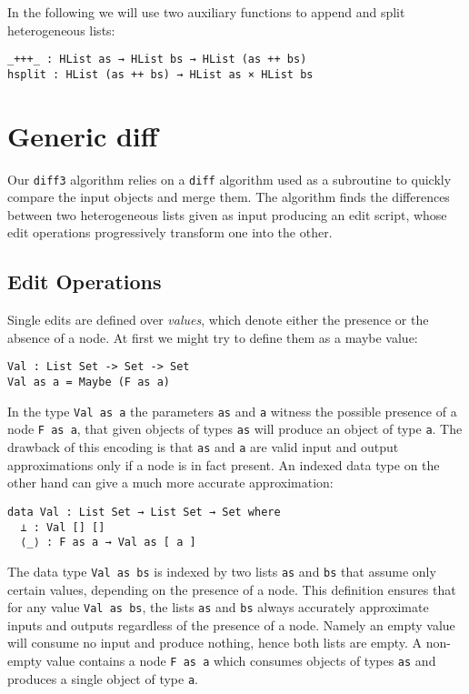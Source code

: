 \documentclass[preprint]{sigplanconf}
\theoremstyle{plain}
\begin{document}
	In the following we will use two auxiliary functions to append and split 
	heterogeneous lists:
\begin{verbatim}
_+++_ : HList as → HList bs → HList (as ++ bs)
hsplit : HList (as ++ bs) → HList as × HList bs
\end{verbatim}
	
\section{Generic diff}
	Our \texttt{diff3} algorithm relies on a \texttt{diff} algorithm used 
        as a subroutine to quickly compare the input objects and merge them.
	The algorithm finds the differences between two heterogeneous lists given 
	as input producing an edit script, whose edit operations progressively 
	transform one into the other.

	\subsection{Edit Operations}
	Single edits are defined over \emph{values}, which denote either the presence or 
	the absence of a node.
        At first we might try to define them as a maybe value:
\begin{verbatim}
Val : List Set -> Set -> Set
Val as a = Maybe (F as a)
\end{verbatim}
        In the type \texttt{Val as a} the parameters \texttt{as} and \texttt{a} 
        witness the possible presence of a node \texttt{F as a}, that given objects 
        of types \texttt{as} will produce an object of type \texttt{a}.
        The drawback of this encoding is that \texttt{as} and \texttt{a} are 
        valid input and output approximations only if a node is in fact present.
        An indexed data type on the other hand can give a much more accurate
        approximation:
\begin{verbatim}
data Val : List Set → List Set → Set where
  ⊥ : Val [] []
  ⟨_⟩ : F as a → Val as [ a ] 
\end{verbatim}
        The data type \texttt{Val as bs} is indexed by two lists \texttt{as} and 
        \texttt{bs} that assume only certain values, depending on the presence
        of a node. This definition ensures that for any value \texttt{Val as bs}, 
        the lists \texttt{as} and \texttt{bs} always accurately approximate inputs 
        and outputs regardless of the presence of a node.
	Namely an empty value will consume no input and produce nothing, hence
        both lists are empty.
        A non-empty value contains a node \texttt{F as a} which consumes 
        objects of types \texttt{as} and produces a single object of type \texttt{a}.
\end{document}
